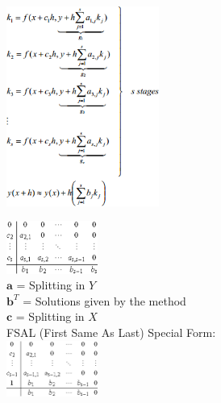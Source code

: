     \begin{minipage}{6cm}
        \includegraphics[width=5cm]{./bilder/ode_rungekutta_framework1.png}
    \end{minipage}
    \begin{minipage}{4.5cm}
        \includegraphics[width=3cm]{./bilder/ode_rungekutta_butcher.png}\\
        $\bm a$ = Splitting in $Y$\\
        $\bm b^T$ = Solutions given by the method\\
        $\bm c$ = Splitting in $X$\\

        FSAL (First Same As Last) Special Form:\\
        \includegraphics[width=3cm]{./bilder/butcher_fsal.png}
    \end{minipage}
    \hspace{0.5cm}
